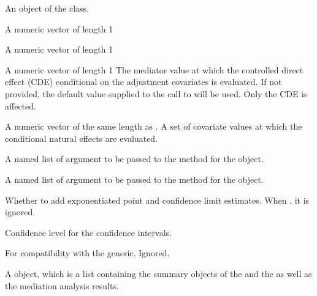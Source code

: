 \documentclass[a4paper]{book}
\begin{document}
\begin{Arguments}
\begin{ldescription}
\item[\code{object}] An object of the  class.

\item[\code{a0}] A numeric vector of length 1

\item[\code{a1}] A numeric vector of length 1

\item[\code{m\_cde}] A numeric vector of length 1 The mediator value at which the controlled direct effect (CDE) conditional on the adjustment covariates is evaluated. If not provided, the default value supplied to the call to  will be used. Only the CDE is affected.

\item[\code{c\_cond}] A numeric vector of the same length as . A set of covariate values at which the conditional natural effects are evaluated.

\item[\code{args\_mreg\_fit}] A named list of argument to be passed to the method for the  object.

\item[\code{args\_yreg\_fit}] A named list of argument to be passed to the method for the  object.

\item[\code{exponentiate}] Whether to add exponentiated point and confidence limit estimates. When , it is ignored.

\item[\code{level}] Confidence level for the confidence intervals.

\item[\code{...}] For compatibility with the generic. Ignored.
\end{ldescription}
\end{Arguments}
%
\begin{Value}
A  object, which is a list containing the summary objects of the  and the  as well as the mediation analysis results.
\end{Value}
%
\end{document}
